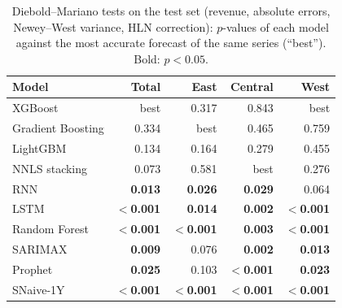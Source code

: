 \begin{table}[t]\centering
\caption{Diebold--Mariano tests on the test set (revenue, absolute errors, Newey--West variance, HLN correction): $p$-values of each model against the most accurate forecast of the same series (``best''). Bold: $p<0.05$.}\label{tab:dm}
\footnotesize
\begin{tabular}{@{}lrrrr@{}}
\toprule
Model & Total & East & Central & West \\
\midrule
XGBoost & best & 0.317 & 0.843 & best \\
Gradient Boosting & 0.334 & best & 0.465 & 0.759 \\
LightGBM & 0.134 & 0.164 & 0.279 & 0.455 \\
NNLS stacking & 0.073 & 0.581 & best & 0.276 \\
RNN & \textbf{0.013} & \textbf{0.026} & \textbf{0.029} & 0.064 \\
LSTM & \textbf{$<$0.001} & \textbf{0.014} & \textbf{0.002} & \textbf{$<$0.001} \\
Random Forest & \textbf{$<$0.001} & \textbf{$<$0.001} & \textbf{0.003} & \textbf{$<$0.001} \\
SARIMAX & \textbf{0.009} & 0.076 & \textbf{0.002} & \textbf{0.013} \\
Prophet & \textbf{0.025} & 0.103 & \textbf{$<$0.001} & \textbf{0.023} \\
SNaive-1Y & \textbf{$<$0.001} & \textbf{$<$0.001} & \textbf{$<$0.001} & \textbf{$<$0.001} \\
\bottomrule
\end{tabular}
\end{table}
